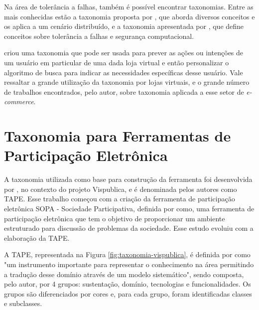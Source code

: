 \vspace{0.5cm}
\par
Na área de tolerância a falhas, também é possível encontrar taxonomias. Entre as mais conhecidas estão a taxonomia proposta por
, que aborda diversos conceitos e os aplica a um cenário distribuído,
e a taxonomia apresentada por , que define conceitos sobre tolerância a falhas e segurança computacional.

\par
{} criou uma taxonomia que pode ser usada para prever as ações ou intenções de um usuário em particular de uma dada loja virtual
e então personalizar o algoritmo de busca para indicar as necessidades específicas desse usuário. Vale ressaltar a grande utilização da taxonomia por lojas virtuais, 
e o grande número de trabalhos encontrados, pelo autor, sobre taxonomia aplicada a esse setor de \textit{e-commerce}.

\section{Taxonomia para Ferramentas de Participação Eletrônica}
\label{subsec:taxonomia e-part tools}

\par
A taxonomia utilizada como base para construção da ferramenta foi desenvolvida por , no contexto do projeto Vispublica, e é denominada pelos autores como TAPE. 
Esse trabalho começou com a criação da ferramenta de participação eletrônica SOPA - Sociedade Participativa, definida por  como, uma ferramenta
de participação eletrônica que tem o objetivo de proporcionar um ambiente estruturado para discussão de problemas da sociedade.
Esse estudo evoluiu com a elaboração da TAPE. 

\par
A TAPE, representada na Figura \ref{fig:taxonomia-vispublica}, é definida por  como "um instrumento importante para representar o conhecimento na área 
permitindo a tradução desse domínio através de um modelo sistemático", sendo composta, pelo autor, por 4 grupos: sustentação, domínio, tecnologias e funcionalidades.
Os grupos são diferenciados por cores e, para cada grupo, foram identificadas classes e subclasses.

